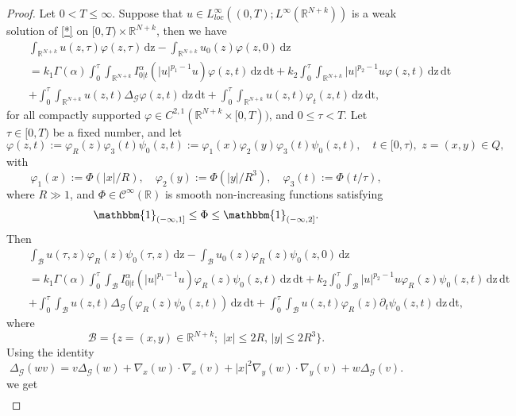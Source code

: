 \documentclass[reqno,11pt]{amsart}
\numberwithin{equation}{section}
\def\R{{\mathbb {R}}}
\newcommand{\abs}[1]{\lvert#1\rvert}
\def\R{\mathbb{R}}
\begin{document}
\begin{proof}
	Let $0<T\leq\infty$. Suppose that $ u\in  L_{loc}^\infty((0,T);L^\infty(\R^{N+k}))$ is a weak solution of \eqref{*}  on $[0,T)\times \R^{N+k}$, then we have
	\begin{eqnarray*}
		&&\int_{\R^{N+k}}u(z,\tau)\varphi(z,\tau)\,\mathrm{dz}-\int_{\R^{N+k}}u_0(z)\varphi(z,0)\,\mathrm{dz}\nonumber\\
		&&=k_1\Gamma(\alpha)\int_0^\tau\int_{\R^{N+k}}I^\alpha_{0|t}(|u|^{p_1-1}u)\varphi(z,t)\,\mathrm{dz}\,\mathrm{dt}+k_2\int_0^\tau\int_{\R^{N+k}}|u|^{p_2-1}u\varphi(z,t)\,\mathrm{dz}\,\mathrm{dt}\nonumber\\
		&&+\int_0^\tau\int_{\R^{N+k}}u(z,t)\Delta_{\mathcal{G}}\varphi(z,t)\,\mathrm{dz}\,\mathrm{dt}+\int_0^\tau\int_{\R^{N+k}}u(z,t)\varphi_t(z,t)\,\mathrm{dz}\,\mathrm{dt},
	\end{eqnarray*}
	for all compactly supported $\varphi\in C^{2,1}(\R^{N+k}\times[0,T))$, and $0\leq\tau<T$. Let $\tau\in[0,T)$ be a fixed number, and let
	$$\varphi(z,t):= \varphi_R(z)\varphi_3(t)\psi_0(z,t):=\varphi_1(x)\varphi_2(y)\varphi_3(t) \psi_0(z,t),\quad t\in[0,\tau),\,\,z=(x,y)\in Q,$$
	with
	$$\varphi_1(x):=\Phi\left(\abs{x}/R\right),\quad \varphi_2(y):=\Phi\left(\abs{y}/R^3\right),\quad \varphi_3(t):=\Phi\left(t/\tau\right),$$
	where $R\gg 1$, and $\Phi\in \mathcal{C}^\infty(\mathbb{R})$ is smooth non-increasing functions 
	satisfying 
	$$\mathbbm{1}_{(-\infty,1]} \leq \Phi\leq \mathbbm{1}_{(-\infty,2]}.$$
	Then
	\begin{eqnarray*}
		&&\int_{\mathcal{B}}u(\tau,z)\varphi_R(z)\psi_0(\tau,z)\,\mathrm{dz}-\int_{\mathcal{B}}u_0(z)\varphi_R(z)\psi_0(z,0)\,\mathrm{dz}\nonumber\\
		&&=k_1\Gamma(\alpha)\int_0^\tau\int_{\mathcal{B}}I^\alpha_{0|t}(|u|^{p_1-1}u)\varphi_R(z)\psi_0(z,t)\,\mathrm{dz}\,\mathrm{dt}+k_2\int_0^\tau\int_{\mathcal{B}}|u|^{p_2-1}u\varphi_R(z)\psi_0(z,t)\,\mathrm{dz}\,\mathrm{dt}\nonumber\\
		&&+\int_0^\tau\int_{\mathcal{B}}u(z,t)\Delta_{\mathcal{G}}\left(\varphi_R(z)\psi_0(z,t)\right)\,\mathrm{dz}\,\mathrm{dt}+\int_0^\tau\int_{\mathcal{B}}u(z,t)\varphi_R(z)\partial_t\psi_0(z,t)\,\mathrm{dz}\,\mathrm{dt},
	\end{eqnarray*}
	where
	$$\mathcal{B}=\{z=(x,y)\in \R^{N+k};\,\,|x|\leq 2R,\,|y|\leq 2R^3\}.$$
	Using the identity
	$$\Delta_{\mathcal{G}}(wv)=v \Delta_{\mathcal{G}}(w)+\nabla_x(w)\cdotp\nabla_x(v)+|x|^2\nabla_y(w)\cdotp\nabla_y(v)+w\Delta_{\mathcal{G}}(v).$$
	we get
	\begin{eqnarray*}

\end{eqnarray*}
\end{proof}
\end{document}
